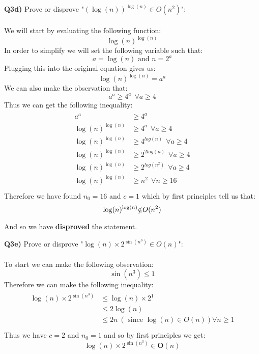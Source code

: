 \documentclass[12pt]{article}
\begin{document}
\begin{adjustwidth}{0em}{0pt}
\textbf{Q3d)} Prove or disprove "$(\log(n))^{\log(n)} \in O(n^2)$":\\ \\
We will start by evaluating the following function:
\[ \log(n)^{\log(n)} \]
In order to simplify we will set the following variable such that:
\[ a = \log(n) \text { and } n = 2^a \]
Plugging this into the original equation gives us:
\[ \log(n)^{\log(n)} = a^a \] 
We can also make the observation that:
\[ a^a \geq 4^a  \ \ \forall a \geq 4 \] 
Thus we can get the following inequality: 
\begin{align*}
    \begin{aligned}
       a^a &\geq 4^a  \\
       \log(n)^{\log(n)} &\geq 4^a \ \ \forall a \geq 4  \\
       \log(n)^{\log(n)} &\geq 4^{log(n)} \ \ \forall a \geq 4 \\
       \log(n)^{\log(n)} &\geq 2^{2log(n)} \ \ \forall a \geq 4 \\
       \log(n)^{\log(n)} &\geq 2^{log(n^2)} \ \ \forall a \geq 4 \\
       \log(n)^{\log(n)} &\geq n^2 \ \ \forall n \geq 16 \\
    \end{aligned}
\end{align*}
Therefore we have found $n_0 = 16$ and $c=1$ which by first principles tell us that: 
\[  \log(n)^{\log(n)} \xout{\in} O(n^2) \]
And so we have \textbf{disproved} the statement.
\end{adjustwidth}

\newpage
\begin{adjustwidth}{0em}{0pt}
\textbf{Q3e)} Prove or disprove "$\log(n)\times2^{\sin(n^3)} \in O(n)$":\\ \\
To start we can make the following observation:
\[ \sin(n^3) \leq 1 \] 
Therefore we can make the following inequality: 
\begin{align*}
    \begin{aligned}
       \log(n)\times2^{\sin(n^3)} &\leq \log(n)\times2^{1} \\
        &\leq 2\log(n)  \\
        &\leq 2n  \ (\text{ since } \log(n) \in O(n)) \forall n \geq 1 \\
    \end{aligned}
\end{align*}
Thus we have $c = 2$ and $n_0 = 1$ and so by first principles we get:
\[ \log(n)\times2^{\sin(n^3)} \in \bm{O}(n) \] 


\end{adjustwidth}
\end{document}
